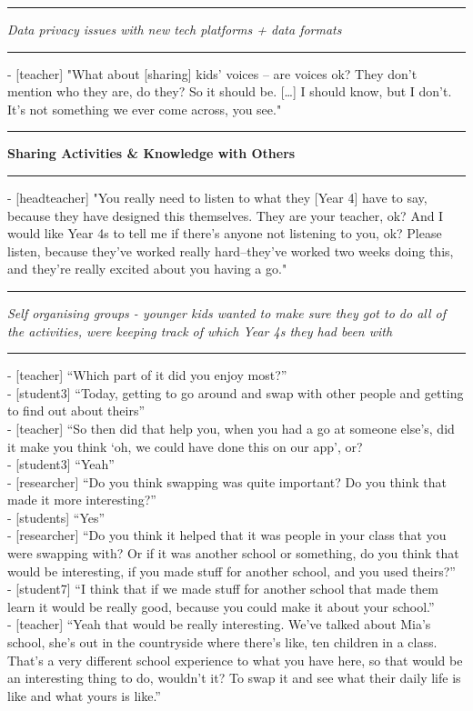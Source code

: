 \par\noindent\rule{\textwidth}{1pt}

\textit{Data privacy issues with new tech platforms + data formats }

\par\noindent\rule{\textwidth}{1pt}

- [teacher] "What about [sharing] kids’ voices – are voices ok? They don’t mention who they are, do they? So it should be. […] I should know, but I don’t. It’s not something we ever come across, you see."

\par\noindent\rule{\textwidth}{1pt}

\textbf{Sharing Activities \& Knowledge with Others}

\par\noindent\rule{\textwidth}{1pt}

- [headteacher] "You really need to listen to what they [Year 4] have to say, because they have designed this themselves. They are your teacher, ok? And I would like Year 4s to tell me if there's anyone not listening to you, ok? Please listen, because they've worked really hard--they've worked two weeks doing this, and they're really excited about you having a go."

\par\noindent\rule{\textwidth}{1pt}

\textit{Self organising groups - younger kids wanted to make sure they got to do all of the activities, were keeping track of which Year 4s they had been with}

\par\noindent\rule{\textwidth}{1pt}

- [teacher] “Which part of it did you enjoy most?”\\
- [student3] “Today, getting to go around and swap with other people and getting to find out about theirs”\\
- [teacher] “So then did that help you, when you had a go at someone else’s, did it make you think ‘oh, we could have done this on our app’, or?\\
- [student3]  “Yeah”\\
- [researcher] “Do you think swapping was quite important? Do you think that made it more interesting?”\\
- [students] “Yes”\\
- [researcher] “Do you think it helped that it was people in your class that you were swapping with? Or if it was another school or something, do you think that would be interesting, if you made stuff for another school, and you used theirs?”\\
- [student7] “I think that if we made stuff for another school that made them learn it would be really good, because you could make it about your school.”\\
- [teacher] “Yeah that would be really interesting. We’ve talked about Mia’s school, she’s out in the countryside where there’s like, ten children in a class. That’s a very different school experience to what you have here, so that would be an interesting thing to do, wouldn’t it? To swap it and see what their daily life is like and what yours is like.”

